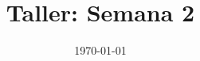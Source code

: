 \documentclass[a4paper]{article}
\date{\today}
\title{Taller: Semana 2}
\begin{document}
\header{}

\begin{answer}[Problema 1.]
    \begin{enumerate}



    \end{enumerate}
\end{answer}
\begin{answer}[Problema 2.]
    \begin{enumerate}



    \end{enumerate}








\end{answer}
\end{document}
